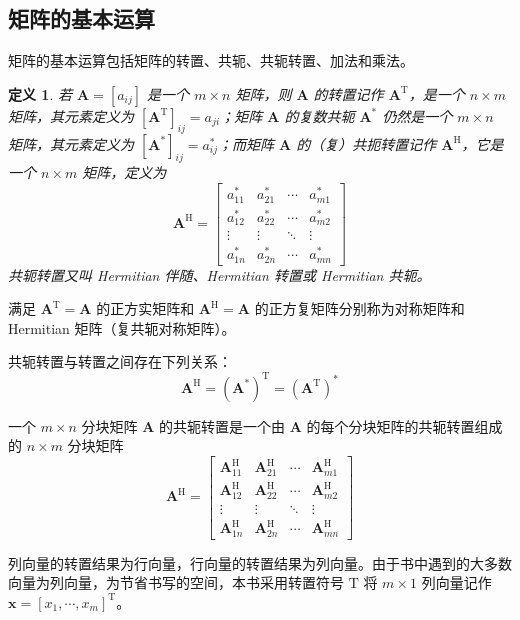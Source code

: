 \documentclass[punct=kaiming, fontset=fandol]{ctexbook}
\numberwithin{equation}{section}
\theoremstyle{mystyle}
\newtheorem{defn}{定义}[section]
\def\TT{\symsfup{T}}
\def\HH{\symsfup{H}}
\def\bf#1{\symbfit{#1}}
\def\TT{\mathrm{T}}
\def\HH{\mathrm{H}}
\def\bf#1{\bm{#1}}
\begin{document}
  \subsection{矩阵的基本运算}
  矩阵的基本运算包括矩阵的转置、共轭、共轭转置、加法和乘法。
  \begin{defn}
    若 $\bf A = [a_{ij}]$ 是一个 $m \times n$ 矩阵，则 $\bf A$ 的转置记作 $\bf A^{\TT}$，是一个 $n \times m$ 矩阵，其元素定义为 $[\bf A^{\TT}]_{ij} = a_{ji}$；矩阵 $\bf A$ 的复数共轭 $\bf A^*$ 仍然是一个 $m\times n$ 矩阵，其元素定义为 $[\bf A^*]_{ij} = a_{ij}^*$；而矩阵 $\bf A$ 的（复）共扼转置记作 $\bf A^{\HH}$，它是一个 $n\times m$ 矩阵，定义为
    \begin{equation}
      \bf A^{\HH} = \begin{bmatrix}
        a_{11}^*  & a_{21}^*  & \cdots  & a_{m1}^*  \\
        a_{12}^*  & a_{22}^*  & \cdots  & a_{m2}^*  \\
        \vdots    & \vdots    & \ddots  & \vdots    \\
        a_{1n}^*  & a_{2n}^*  & \cdots  & a_{mn}^*
      \end{bmatrix}
    \end{equation}
    共轭转置又叫 Hermitian 伴随、Hermitian 转置或 Hermitian 共轭。
  \end{defn}
  满足 $\bf A^{\TT} = \bf A$ 的正方实矩阵和 $\bf A^{\HH} = \bf A$ 的正方复矩阵分别称为对称矩阵和 Hermitian 矩阵（复共轭对称矩阵）。

  共轭转置与转置之间存在下列关系：
  \begin{equation}
    \bf A^{\HH} = (\bf A^*)^{\TT} = (\bf A^{\TT})^*
  \end{equation}

  一个 $m \times n$ 分块矩阵 $\bf A$ 的共轭转置是一个由 $\bf A$ 的每个分块矩阵的共轭转置组成的 $n \times m$ 分块矩阵
  \[
    \bf A^{\HH} = \begin{bmatrix}
      \bf A_{11}^{\HH}  & \bf A_{21}^{\HH}  & \cdots  & \bf A_{m1}^{\HH}  \\
      \bf A_{12}^{\HH}  & \bf A_{22}^{\HH}  & \cdots  & \bf A_{m2}^{\HH}  \\
      \vdots            & \vdots            & \ddots  & \vdots            \\
      \bf A_{1n}^{\HH}  & \bf A_{2n}^{\HH}  & \cdots  & \bf A_{mn}^{\HH}
    \end{bmatrix}
  \]

  列向量的转置结果为行向量，行向量的转置结果为列向量。由于书中遇到的大多数向量为列向量，为节省书写的空间，本书采用转置符号 $\TT$ 将 $m \times 1$ 列向量记作 $\bf x = [x_1,\cdots,x_m]^{\TT}$。
\end{document}
